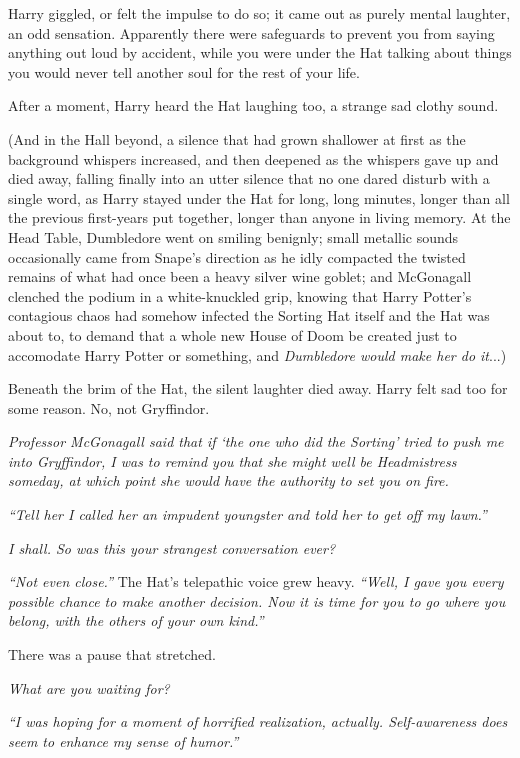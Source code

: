Harry giggled, or felt the impulse to do so; it came out as purely mental laughter, an odd sensation. Apparently there were safeguards to prevent you from saying anything out loud by accident, while you were under the Hat talking about things you would never tell another soul for the rest of your life.

After a moment, Harry heard the Hat laughing too, a strange sad clothy sound.

(And in the Hall beyond, a silence that had grown shallower at first as the background whispers increased, and then deepened as the whispers gave up and died away, falling finally into an utter silence that no one dared disturb with a single word, as Harry stayed under the Hat for long, long minutes, longer than all the previous first-years put together, longer than anyone in living memory. At the Head Table, Dumbledore went on smiling benignly; small metallic sounds occasionally came from Snape’s direction as he idly compacted the twisted remains of what had once been a heavy silver wine goblet; and McGonagall clenched the podium in a white-knuckled grip, knowing that Harry Potter’s contagious chaos had somehow infected the Sorting Hat itself and the Hat was about to, to demand that a whole new House of Doom be created just to accomodate Harry Potter or something, and \emph{Dumbledore would make her do it}...)

Beneath the brim of the Hat, the silent laughter died away. Harry felt sad too for some reason. No, not Gryffindor.

\emph{Professor McGonagall said that if ‘the one who did the Sorting’ tried to push me into Gryffindor, I was to remind you that she might well be Headmistress someday, at which point she would have the authority to set you on fire.}

\emph{“Tell her I called her an impudent youngster and told her to get off my lawn.”}

\emph{I shall. So was this your strangest conversation ever?}

\emph{“Not even close.”} The Hat’s telepathic voice grew heavy. \emph{“Well, I gave you every possible chance to make another decision. Now it is time for you to go where you belong, with the others of your own kind.”}

There was a pause that stretched.

\emph{What are you waiting for?}

\emph{“I was hoping for a moment of horrified realization, actually. Self-awareness does seem to enhance my sense of humor.”}

